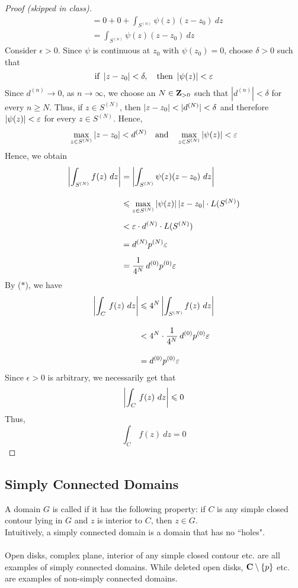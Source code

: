 \begin{proof}[Proof (skipped in class)]
\begin{align*}
&= 0 + 0 + \int_{S^{(n)}}\psi(z)(z - z_0)\ dz\\[1em]
&= \int_{S^{(n)}}\psi(z)(z - z_0)\ dz
\end{align*}
Consider $\epsilon > 0$. Since $\psi$ is continuous at $z_0$ with $\psi(z_0) = 0$, choose $\delta > 0$ such that
\[\text{if } \left\lvert z - z_0\right\rvert < \delta,\quad \text{then } \left\lvert\psi(z)\right\rvert < \varepsilon\]
Since $d^{(n)} \to 0$, as $n \to \infty$, we choose an $N \in \mathbf Z_{>0}$ such that $|d^{(n)}|< \delta$ for every $n \geq N$. Thus, if $z \in S^{(N)}$, then $\left\lvert z - z_0\right\rvert < |d^{(N)}| < \delta$ and therefore $\left\lvert\psi(z)\right\rvert < \varepsilon$ for every $z \in S^{(N)}$. Hence, 
\[\max_{z \in S^{(N)}} \left\lvert z - z_0\right\rvert < d^{(N)} \quad \text{and} \quad \max_{z \in S^{(N)}} \left\lvert\psi(z)\right\rvert < \varepsilon\]
Hence, we obtain
\begin{align*}
\abs{\int_{S^{(N)}}f(z)\ dz} &= \abs{\int_{S^{(N)}}\psi(z)(z - z_0)\ dz}\\[1em]
 &\leq \max_{z \in S^{(N)}}\abs{\psi(z)}\abs{z - z_0}\cdot L(S^{(N)})\\[0.5em]
 &< \epsilon\cdot d^{(N)}\cdot L(S^{(N)})\\[0.5em]
 &= d^{(N)}p^{(N)}\epsilon\\[0.5em]
 &= \frac{1}{4^N}\,d^{(0)}p^{(0)}\epsilon
\end{align*}
By ($*$), we have
\begin{align*}
\left\lvert\int_C\,f(z)\ dz\right\rvert &\leqslant 4^N\left\lvert\int_{S^{(N)}}f(z)\ dz\right\rvert\\[1em]
 &< 4^N\cdot \frac{1}{4^N}\,d^{(0)}p^{(0)}\varepsilon\\[1em]
 &= d^{(0)}p^{(0)}\varepsilon
\end{align*}
Since $\epsilon > 0$ is arbitrary, we necessarily get that
\[\left\lvert\int_C\,f(z)\ dz\right\rvert \leqslant 0\]
Thus, 
\[\int_C\,f(z)\ dz = 0\]
\end{proof}

\bigskip

\subsection{Simply Connected Domains}

\begin{definition}
A domain $G$ is called  if it has the following property: if $C$ is any simple closed contour lying in $G$ and $z$ is interior to $C$, then $z \in G$.\\[0.5em]
Intuitively, a simply connected domain is a domain that has no ``holes".\\
\\
Open disks, complex plane, interior of any simple closed contour etc. are all examples of simply connected domains. While deleted open disks, $\mathbf C\setminus\left\{p\right\}$ etc. are examples of non-simply connected domains.
\end{definition}

